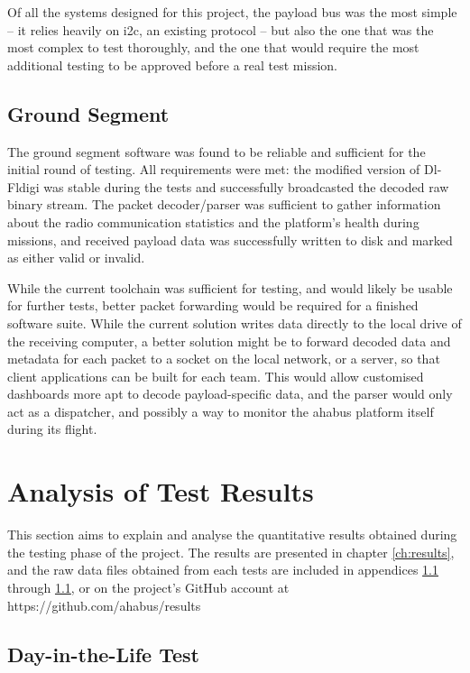Of all the systems designed for this project, the payload bus was the most
simple – it relies heavily on \acrshort{i2c}, an existing protocol – but also
the one that was the most complex to test thoroughly, and the one that would
require the most additional testing to be approved before a real test mission.

\subsection{Ground Segment}

The ground segment software was found to be reliable and sufficient for the
initial round of testing. All requirements were met: the modified version of
Dl-Fldigi was stable during the tests and successfully broadcasted the decoded
raw binary stream. The packet decoder/parser was sufficient to gather
information about the radio communication statistics and the platform's health
during missions, and received payload data was successfully written to disk
and marked as either valid or invalid.

While the current toolchain was sufficient for testing, and would likely be
usable for further tests, better packet forwarding would be required for a
finished software suite. While the current solution writes data directly to the
local drive of the receiving computer, a better solution might be to forward
decoded data and metadata for each packet to a socket on the local network, or
a server, so that client applications can be built for each team. This would
allow customised dashboards more apt to decode payload-specific data, and the
parser would only act as a dispatcher, and possibly a way to monitor the
\acrshort{ahabus} platform itself during its flight.

\section{Analysis of Test Results}

This section aims to explain and analyse the quantitative results obtained
during the testing phase of the project. The results are presented in chapter
\ref{ch:results}, and the raw data files obtained from each tests are included
in appendices \ref{} through \ref{}, or on the project's GitHub account at
https://github.com/ahabus/results

\subsection{Day-in-the-Life Test}


